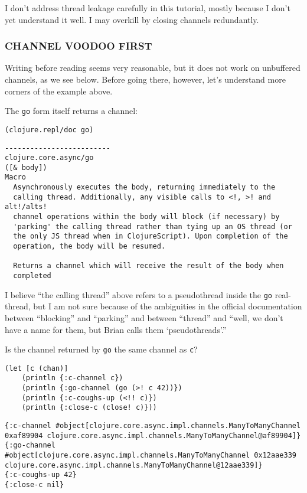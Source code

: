 \documentclass[10pt,oneside,x11names]{article}
\begin{document}
I don't address thread leakage carefully in this tutorial, mostly
because I don't yet understand it well. I may overkill by closing
channels redundantly.

\subsubsection{CHANNEL VOODOO FIRST}
\label{channel-voodoo-first}
Writing before reading seems very reasonable, but it does not work on
unbuffered channels, as we see below. Before going there, however, let's
understand more corners of the example above.

The \texttt{go} form itself returns a channel:

\begin{verbatim}
(clojure.repl/doc go)
\end{verbatim}

\begin{verbatim}
-------------------------
clojure.core.async/go
([& body])
Macro
  Asynchronously executes the body, returning immediately to the
  calling thread. Additionally, any visible calls to <!, >! and alt!/alts!
  channel operations within the body will block (if necessary) by
  'parking' the calling thread rather than tying up an OS thread (or
  the only JS thread when in ClojureScript). Upon completion of the
  operation, the body will be resumed.

  Returns a channel which will receive the result of the body when
  completed
\end{verbatim}

I believe ``the calling thread'' above refers to a pseudothread inside the
\texttt{go} real-thread, but I am not sure because of the ambiguities in the
official documentation between ``blocking'' and ``parking'' and between
``thread'' and ``well, we don't have a name for them, but Brian calls them
`pseudothreads'.''

Is the channel returned by \texttt{go} the same channel as \texttt{c}?

\begin{verbatim}
(let [c (chan)]
    (println {:c-channel c})
    (println {:go-channel (go (>! c 42))})
    (println {:c-coughs-up (<!! c)})
    (println {:close-c (close! c)}))
\end{verbatim}

\begin{verbatim}
{:c-channel #object[clojure.core.async.impl.channels.ManyToManyChannel 0xaf89904 clojure.core.async.impl.channels.ManyToManyChannel@af89904]}
{:go-channel #object[clojure.core.async.impl.channels.ManyToManyChannel 0x12aae339 clojure.core.async.impl.channels.ManyToManyChannel@12aae339]}
{:c-coughs-up 42}
{:close-c nil}
\end{verbatim}
\end{document}
